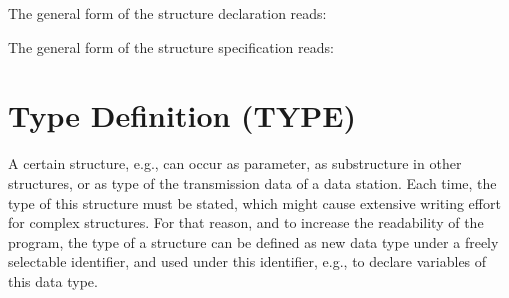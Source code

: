 The general form of the structure declaration reads:










The general form of the structure specification reads:




\section{Type Definition (TYPE)} %
\label{sec_type}

A certain structure, e.g., can occur as parameter, as substructure in other
structures, or as type of the transmission data of a data station.  Each
time, the type of this structure must be stated, which might cause
extensive writing effort for complex structures. For that reason, and to
increase the readability of the program, the type of a structure can be
defined as new data type under a freely selectable identifier, and used
under this identifier, e.g., to declare variables of this data type.

